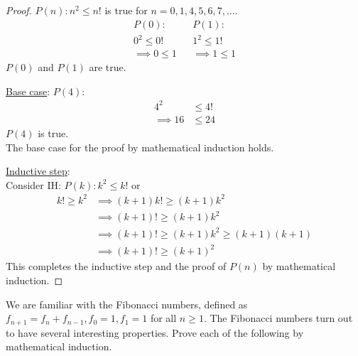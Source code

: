 \documentclass[a4paper]{exam}
\begin{document}
\begin{questions}
\begin{solution}
    \begin{proof} $P(n): n^2\le n!$ is true for $n=0,1,4,5,6,7,\ldots$.
      \begin{align*}
        P(0): & & P(1):\\
        0^2  \le 0! && 1^2 \le 1!\\
        \implies 0  \le 1 && \implies 1 \le 1
      \end{align*}
      $P(0)$ and $P(1)$ are true.

      \underline{Base case}: $P(4)$:\\
      \begin{align*}
        4^2  & \le 4!\\
        \implies 16  &\le 24
      \end{align*}
        $P(4)$ is true.\\
        The base case for the proof by mathematical induction holds.

      \underline{Inductive step}:\\
      Consider IH: $P(k): k^2\le k!$ or
      \begin{align*}
        k!\ge k^2 &\implies (k+1)k! \ge (k+1)k^2\\
                  &\implies (k+1)! \ge (k+1)k^2\\
                  &\implies (k+1)! \ge (k+1)k^2 \ge (k+1)(k+1)\\
                  &\implies (k+1)! \ge (k+1)^2
      \end{align*}
      This completes the inductive step and the proof of $P(n)$ by mathematical induction.
      \end{proof}
  \end{solution}

\question We are familiar with the Fibonacci numbers, defined as $f_{n+1} = f_n + f_{n-1}, f_0=1, f_1=1$ for all $n \geq 1$. The Fibonacci numbers turn out to have several interesting properties. Prove each of the following by mathematical induction.
\end{questions}
\end{document}
